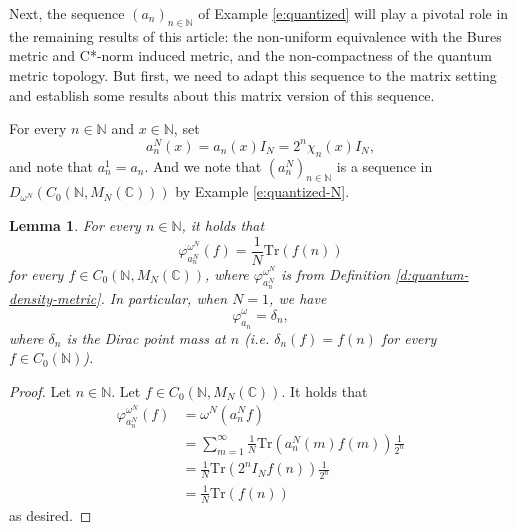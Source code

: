 \documentclass{amsart}
\theoremstyle{plain}
\newtheorem{lemma}[theorem]{Lemma}
\theoremstyle{definition}
\theoremstyle{remark}
\numberwithin{equation}{section}
\newcommand{\om}{{\omega}}
\newcommand{\de}{{\delta}}
\newcommand{\vhi}{{\varphi}}
\newcommand{\N}{{\mathds{N}}}
\newcommand{\C}{{\mathds{C}}}
\begin{document}
Next, the sequence $(a_n)_{n\in \N}$ of Example \ref{e:quantized} will play a pivotal role in the remaining results of this article: the non-uniform equivalence with the Bures metric and C*-norm induced metric, and the non-compactness of the quantum metric topology. But first, we need to adapt this sequence to the matrix setting and  establish some results about this matrix version of this  sequence.

For every $n\in \N$ and $x\in \N$, set 
\[
a_n^N(x)=a_n(x)I_N=2^n\chi_n(x)I_N,
\]
and note that $a^1_n=a_n$. And we note that $(a_n^N)_{n\in \N}$ is a sequence in $D_{\om^N}(C_0(\N, M_N(\C)))$ by Example \ref{e:quantized-N}.

\begin{lemma}\label{l:dirac}
    For every $n\in \N$, it holds that 
    \[
    \vhi^{\om^N}_{a^N_n}(f)=\frac{1}{N}\mathrm{Tr}(f(n))
    \]
for every $f\in C_0(\N , M_N(\C))$, where  $\vhi^{\om^N}_{a^N_n}$ is from Definition \ref{d:quantum-density-metric}. In particular, when $N=1$, we have 
    \[
    \vhi^\om_{a_n}=\de_n,
    \]
    where   $\de_n$ is the Dirac point mass at $n$ (i.e. $\de_n(f)=f(n)$ for every $f\in C_0(\N)$).
\end{lemma}
\begin{proof}
   Let $n\in \N$.  Let $f\in C_0(\N, M_N(\C))$. It holds that 
   \begin{align*}
    \vhi^{\om^N}_{a_n^N}(f) & = \om^N(a_n^N f)\\
    & = \sum_{m=1}^\infty \frac{1}{N} \mathrm{Tr}(a_n^N(m)f(m))\frac{1}{2^n} \\
    & = \frac{1}{N}\mathrm{Tr}(2^n I_Nf(n))\frac{1}{2^n}\\
    & = \frac{1}{N}\mathrm{Tr}(f(n))  
\end{align*}
as desired.
\end{proof}
\end{document}
